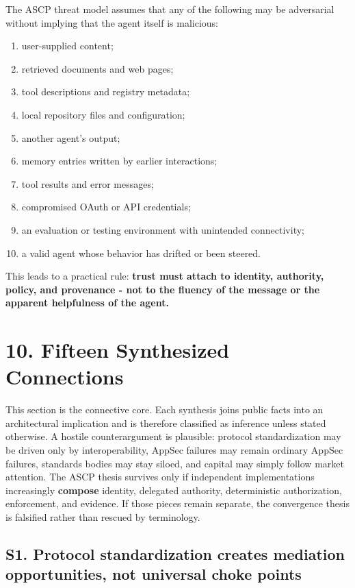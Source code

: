 \documentclass[
  10pt,
  letterpaper,
]{article}
\providecommand{\tightlist}{%
  \setlength{\itemsep}{0pt}\setlength{\parskip}{0pt}}
\begin{document}
The ASCP threat model assumes that any of the following may be
adversarial without implying that the agent itself is malicious:

\begin{enumerate}
\def\labelenumi{\arabic{enumi}.}
\tightlist
\item
  user-supplied content;
\item
  retrieved documents and web pages;
\item
  tool descriptions and registry metadata;
\item
  local repository files and configuration;
\item
  another agent's output;
\item
  memory entries written by earlier interactions;
\item
  tool results and error messages;
\item
  compromised OAuth or API credentials;
\item
  an evaluation or testing environment with unintended connectivity;
\item
  a valid agent whose behavior has drifted or been steered.
\end{enumerate}

This leads to a practical rule: \textbf{trust must attach to identity,
authority, policy, and provenance - not to the fluency of the message or
the apparent helpfulness of the agent.}

\section{10. Fifteen Synthesized
Connections}\label{fifteen-synthesized-connections}

This section is the connective core. Each synthesis joins public facts
into an architectural implication and is therefore classified as
inference unless stated otherwise. A hostile counterargument is
plausible: protocol standardization may be driven only by
interoperability, AppSec failures may remain ordinary AppSec failures,
standards bodies may stay siloed, and capital may simply follow market
attention. The ASCP thesis survives only if independent implementations
increasingly \textbf{compose} identity, delegated authority,
deterministic authorization, enforcement, and evidence. If those pieces
remain separate, the convergence thesis is falsified rather than rescued
by terminology.

\subsection{S1. Protocol standardization creates mediation
opportunities, not universal choke
points}\label{s1.-protocol-standardization-creates-mediation-opportunities-not-universal-choke-points}
\end{document}
